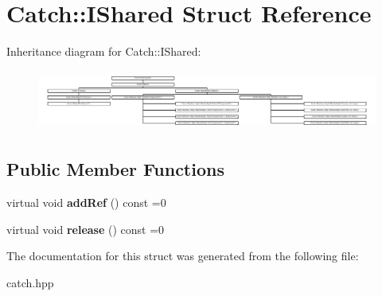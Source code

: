 \hypertarget{structCatch_1_1IShared}{}\section{Catch\+:\+:I\+Shared Struct Reference}
\label{structCatch_1_1IShared}
Inheritance diagram for Catch\+:\+:I\+Shared\+:\begin{figure}[H]
\begin{center}
\leavevmode
\includegraphics[height=2.004474cm]{structCatch_1_1IShared}
\end{center}
\end{figure}
\subsection*{Public Member Functions}
\begin{DoxyCompactItemize}
\item 
\mbox{\label{structCatch_1_1IShared_ae383df68557cdaf0910b411af04d9e33}} 
virtual void {\bfseries add\+Ref} () const =0
\item 
\mbox{\label{structCatch_1_1IShared_a002f52624728a763956fb6f230cb2f57}} 
virtual void {\bfseries release} () const =0
\end{DoxyCompactItemize}


The documentation for this struct was generated from the following file\+:\begin{DoxyCompactItemize}
\item 
catch.\+hpp\end{DoxyCompactItemize}
